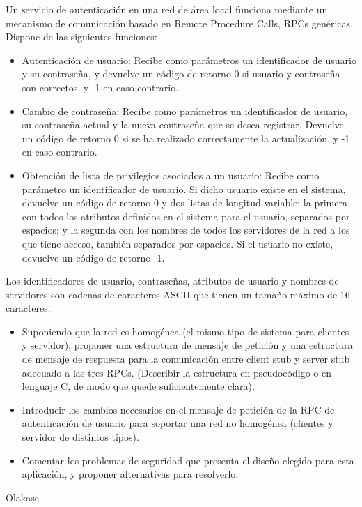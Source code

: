   \begin{problem}[19]
  Un servicio de autenticación en una red de área local funciona
mediante un mecanismo de comunicación basado en Remote Procedure Calls,
RPCs genéricas. Dispone de las siguientes funciones:
  \begin{itemize}
    \item Autenticación de usuario: Recibe como parámetros un
identificador de usuario y su contraseña, y devuelve un código de
retorno 0 si usuario y contraseña son correctos, y -1 en caso contrario.
    \item Cambio de contraseña: Recibe como parámetros un
identificador de usuario, su contraseña actual y la nueva contraseña que
 se desea registrar. Devuelve un código de retorno 0 si se ha realizado
correctamente la actualización, y -1 en caso contrario.
    \item Obtención de lista de privilegios asociados a un usuario: Recibe como parámetro
    un identificador de usuario. Si dicho usuario existe en el sistema, devuelve
    un código de retorno 0 y dos listas de longitud variable: la primera con
    todos los atributos definidos en el sistema para el usuario, separados
    por espacios; y la segunda con los nombres de todos los servidores de la
    red a los que tiene acceso, también separados por espacios. Si el usuario
    no existe, devuelve un código de retorno -1.
  \end{itemize}
  Los identificadores de usuario, contraseñas, atributos de usuario y nombres
  de servidores son cadenas de caracteres ASCII que tienen un tamaño máximo
  de 16 caracteres.
  \begin{itemize}
    \item Suponiendo que la red es homogénea (el mismo tipo de sistema
para clientes y servidor), proponer una estructura de mensaje de
petición y una estructura de mensaje de respuesta para la comunicación
entre client stub y server stub adecuado a las tres RPCs. (Describir la
estructura en pseudocódigo o en lenguaje C, de modo que quede
suficientemente clara).
    \item Introducir los cambios necesarios en el mensaje de petición
 de la RPC de autenticación de usuario para soportar una red no
homogénea (clientes y servidor de distintos tipos).
    \item Comentar los problemas de seguridad que presenta el diseño
elegido para esta aplicación, y proponer alternativas para resolverlo.
     \end{itemize}
  \solution

  Olakase

  \end{problem}

